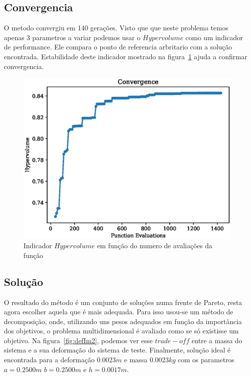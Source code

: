 \documentclass[a4paper,12pt]{article}
\begin{document}
\subsection{Convergencia}

O metodo convergiu em 140 gerações. Visto que que neste problema temos apenas 3 parametros a variar podemos usar o $Hypervolume$ como um indicador de performance. Ele compara o ponto de referencia arbritario com a solução encontrada. Estabilidade deste indicador mostrado na figura~\ref{fig:hyper} ajuda a confirmar convergencia.


\begin{figure}[h]
\begin{center}
\includegraphics[scale=0.7]{convergence.eps}
\end{center}
\caption{Indicador $Hypervolume$ em função do numero de avaliações da função}
\label{fig:hyper}
\end{figure}

\subsection{Solução}

O resultado do método é um conjunto de soluções numa frente de Pareto, resta agora escolher aquela que é mais adequada. Para isso usou-se um método de decomposição, onde, utilizando uns pesos adequados em função da importância dos objetivos, o problema multidimensional é avaliado como se só existisse um objetivo. Na figura~\ref{fig:defIm2}, podemos ver esse $trade-off$ entre a massa do sistema e a sua deformação do sistema de teste.
Finalmente, solução ideal é encontrada para a deformação $0.0023m$ e massa $0.0023kg$ com os parametros $a=0.2500m$ $b=0.2500m$ e $h=0.0017m$.
\end{document}
